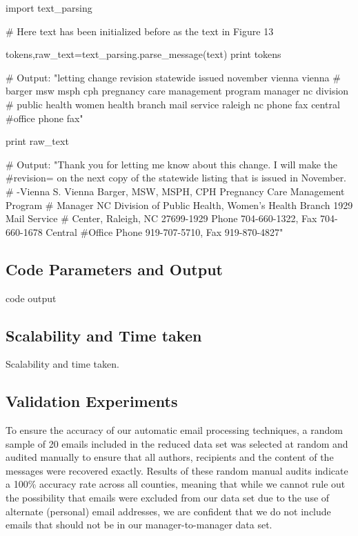 \documentclass[fleqn]{MJDArticle}
\begin{document}
\begin{code}
import text_parsing

# Here text has been initialized before as the text in Figure 13

tokens,raw_text=text_parsing.parse_message(text)
print tokens

# Output: "letting change revision statewide issued november vienna vienna
# barger msw msph cph pregnancy care management program manager nc division
# public health women health branch mail service raleigh nc phone fax central 
#office phone fax"

print raw_text

# Output: "Thank you for letting me know about this change. I will make the 
#revision= on the next copy of the statewide listing that is issued in November.
# -Vienna S. Vienna Barger, MSW, MSPH, CPH Pregnancy Care Management Program
# Manager NC Division of Public Health, Women's Health Branch 1929 Mail Service
# Center, Raleigh, NC 27699-1929 Phone 704-660-1322, Fax 704-660-1678 Central 
#Office Phone 919-707-5710, Fax 919-870-4827"
\end{code}

\subsection{Code Parameters and Output}
code output
\subsection{Scalability and Time taken}
Scalability and time taken.

\subsection{Validation Experiments}

To ensure the accuracy of our automatic email processing techniques, a random sample of 20 emails included in the reduced data set was selected at random and audited manually to ensure that all authors, recipients and the content of the messages were recovered exactly. Results of these random manual audits indicate a 100\% accuracy rate across all counties, meaning that while we cannot rule out the possibility that emails were excluded from our data set due to the use of alternate (personal) email addresses, we are confident that we do not include emails that should not be in our manager-to-manager data set.
\end{document}
